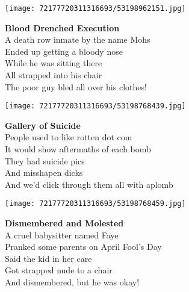 \documentclass[10pt,letterpaper]{article}
\begin{document}
\begin{center}
\texttt{[image: 72177720311316693/53198962151.jpg]}
\end{center}

\begin{center}
\textbf{Blood Drenched Execution}\\
\vskip 0.2in
A death row inmate by the name Mohs\\
Ended up getting a bloody nose\\
While he was sitting there\\
All strapped into his chair\\
The poor guy bled all over his clothes!\\
\end{center}
\pagebreak

\begin{center}
\texttt{[image: 72177720311316693/53198768439.jpg]}
\end{center}

\begin{center}
\textbf{Gallery of Suicide}\\
\vskip 0.2in
People used to like rotten dot com\\
It would show aftermaths of each bomb\\
They had suicide pics\\
And misshapen dicks\\
And we'd click through them all with aplomb\\
\end{center}
\pagebreak

\begin{center}
\texttt{[image: 72177720311316693/53198768459.jpg]}
\end{center}

\begin{center}
\textbf{Dismembered and Molested}\\
\vskip 0.2in
A cruel babysitter named Faye\\
Pranked some parents on April Fool's Day\\
Said the kid in her care\\
Got strapped nude to a chair\\
And dismembered, but he was okay!\\
\end{center}
\pagebreak
\end{document}
